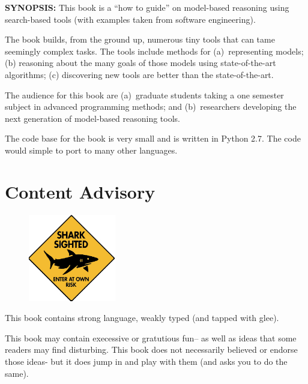 \documentclass[9pt,twocolumn]{article}
\begin{document}
\begin{center}
 \begin{minipage}{.8\linewidth}
  {\bf SYNOPSIS:} This book is a  ``how to guide'' on model-based reasoning using
  search-based tools (with examples taken from software engineering).\vspace{3mm}
  
  The book builds, from the ground up, numerous
  tiny tools that can tame seemingly complex
  tasks. The tools include methods for
  (a)~representing models; (b) reasoning about the
  many goals of those models using state-of-the-art
  algorithms; (c) discovering new tools are better than
  the state-of-the-art. \vspace{3mm}
  
  
  The audience for this book are (a)~graduate  students taking
  a one semester subject in advanced programming methods; and
  (b)~researchers developing the next generation
  of model-based reasoning tools.
   \vspace{3mm}
  
  The code base for the book is very small and is written
  in Python 2.7. The code  would simple to
  port to many other languages.

  \end{minipage}

  \end{center}
\clearpage
\small
\twocolumn

\tableofcontents

\newpage


\section*{Content Advisory }
\begin{figure}
  \includegraphics[width=1.5in]{img/shark.jpg}
  \end{figure}
This book contains strong language, weakly typed (and tapped with glee).

This book may contain execessive or gratutious fun--
as well as ideas that some readers may find disturbing.
This book does not necessarily 
believed or endorse those ideas- but it does jump in and play with them
(and asks you to do the same).
\end{document}
